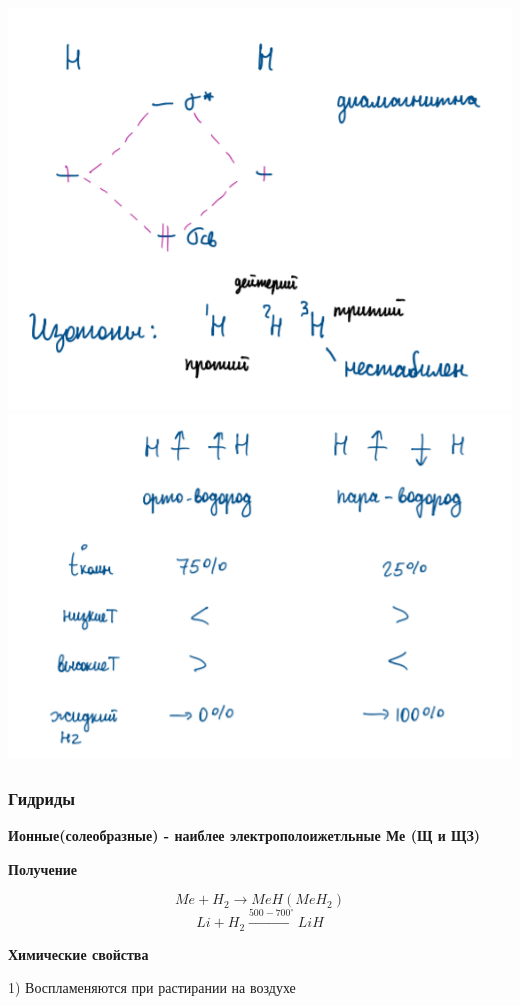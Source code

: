\documentclass[14pt,a4paper]{scrartcl}
\begin{document}
\includegraphics{11v13.png}
\includegraphics[scale=0.95]{11v14.png}

\subsubsection{Гидриды}

\textbf{Ионные(солеобразные) - наиблее электрополоижетльные Ме (Щ и ЩЗ)}

\textbf{Получение}

$$Me + H_2 \rightarrow MeH(MeH_2)$$
$$Li + H_2 \xrightarrow{500-700^{\circ}} LiH$$

\textbf{Химические свойства}

1) Воспламеняются при растирании на воздухе
\end{document}
